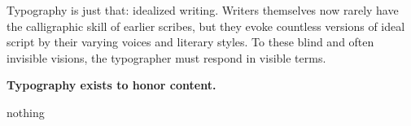 Typography is just that: idealized writing. Writers themselves now rarely have the calligraphic skill of earlier scribes, but they evoke countless versions of ideal script by their varying voices and literary styles. To these blind and often invisible visions, the typographer must respond in visible terms.


\textbf{Typography exists to honor content.}

nothing
